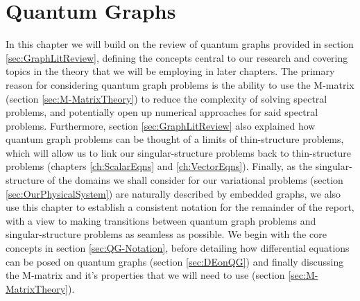 \chapter{Quantum Graphs} \label{ch:QuantumGraphs}
In this chapter we will build on the review of quantum graphs provided in section \ref{sec:GraphLitReview}, defining the concepts central to our research and covering topics in the theory that we will be employing in later chapters.
The primary reason for considering quantum graph problems is the ability to use the M-matrix (section \ref{sec:M-MatrixTheory}) to reduce the complexity of solving spectral problems, and potentially open up numerical approaches for said spectral problems.
Furthermore, section \ref{sec:GraphLitReview} also explained how quantum graph problems can be thought of a limits of thin-structure problems, which will allow us to link our singular-structure problems back to thin-structure problems (chapters \ref{ch:ScalarEqns} and \ref{ch:VectorEqns}).
Finally, as the singular-structure of the domains we shall consider for our variational problems (section \ref{sec:OurPhysicalSystem}) are naturally described by embedded graphs, we also use this chapter to establish a consistent notation for the remainder of the report, with a view to making transitions between quantum graph problems and singular-structure problems as seamless as possible.
We begin with the core concepts in section \ref{sec:QG-Notation}, before detailing how differential equations can be posed on quantum graphs (section \ref{sec:DEonQG}) and finally discussing the M-matrix and it's properties that we will need to use (section \ref{sec:M-MatrixTheory}).

